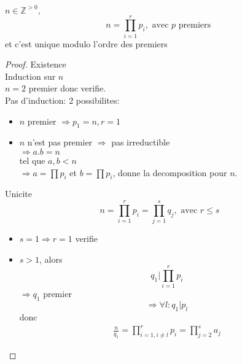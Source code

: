 \documentclass[../main.tex]{subfiles}
\begin{document}
\begin{thm}
$n \in \mathbb{Z}^{>0},$ \\
\[ 
n = \prod_{i=1} ^{r} p_i, \text{ avec } p \text{ premiers } 
\]
et c'est unique modulo l'ordre des premiers
\end{thm}
\begin{proof}
Existence\\
Induction sur $n$ \\
$n=2$ premier donc verifie.\\
Pas d'induction:
2 possibilites:
\begin{itemize}
\item $n$ premier $\Rightarrow p_1 = n, r=1$ 
\item $n$ n'est pas premier
	$\Rightarrow$ pas irreductible\\
	$\Rightarrow a.b =n$ \\
	tel que $a,b < n$\\
	$\Rightarrow a= \prod p_i$   et $b = \prod p_i$, donne la decomposition pour  $n$.
\end{itemize}
Unicite\\
 \[ 
n = \prod_{i=1} ^{r} p_i = \prod _{j=1} ^{s} q_j, \text{ avec  } r \leq s
\]
\begin{itemize}
\item $s=1 \Rightarrow  r=1$ verifie
\item $s>1$, alors
	\[ 
	q_1 | \prod_{i=1} ^{r} p_i
	\]
	$\Rightarrow q_1$ premier\\
	\[ 
	\Rightarrow  \forall l: q_1 | p_l
	\]
	donc
	\begin{align*}
	\frac{n}{q_1}= \prod_{i=1, i \neq l}^{r} p_i = \prod_{j=2} ^{s} a_j	
	\end{align*}
\end{itemize}




\end{proof}
\end{document}

